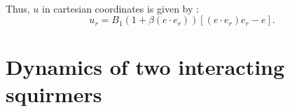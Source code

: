 \documentclass{article}
\begin{document}
\begin{align*}
\end{align*}

\vspace{0.5 cm}
Thus, $u$ in cartesian coordinates is given by :
\begin{equation*}
\boxed{u_r = B_1(1+\beta (e\cdot e_r)) [(e\cdot e_r)e_r - e].}
\end{equation*}

\section{Dynamics of two interacting squirmers}
\end{document}
